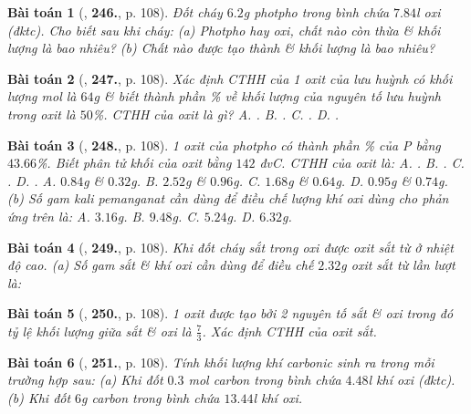 \documentclass{article}
\numberwithin{equation}{section}
\newtheorem{baitoan}{Bài toán}
\begin{document}
\begin{baitoan}[\cite{An_400_BT_Hoa_Hoc_8_2020}, \textbf{246.}, p. 108]
	Đốt cháy $6.2$\emph{g} photpho trong bình chứa $7.84$\emph{l} oxi (đktc). Cho biết sau khi cháy: (a) Photpho hay oxi, chất nào còn thừa \& khối lượng là bao nhiêu? (b) Chất nào được tạo thành \& khối lượng là bao nhiêu?
\end{baitoan}

\begin{baitoan}[\cite{An_400_BT_Hoa_Hoc_8_2020}, \textbf{247.}, p. 108]
	Xác định CTHH của 1 oxit của lưu huỳnh có khối lượng mol là $64$\emph{g} \& biết thành phần \% về khối lượng của nguyên tố lưu huỳnh trong oxit là $50$\%. CTHH của oxit là gì? {\sf A.} \emph{}. {\sf B.} \emph{}. {\sf C.} \emph{}. {\sf D.} \emph{}.
\end{baitoan}

\begin{baitoan}[\cite{An_400_BT_Hoa_Hoc_8_2020}, \textbf{248.}, p. 108]
	1 oxit của photpho có thành phần \% của \emph{P} bằng $43.66$\%. Biết phân tử khối của oxit bằng $142$ \emph{đvC}. CTHH của oxit là: {\sf A.} \emph{}. {\sf B.} \emph{}. {\sf C.} \emph{}. {\sf D.} \emph{}. {\sf A.} $0.84$\emph{g} \& $0.32$\emph{g}. {\sf B.} $2.52$\emph{g} \& $0.96$\emph{g}. {\sf C.} $1.68$\emph{g} \& $0.64$\emph{g}. {\sf D.} $0.95$\emph{g} \& $0.74$\emph{g}. (b) Số gam kali pemanganat \emph{} cần dùng để điều chế lượng khí oxi dùng cho phản ứng trên là: {\sf A.} $3.16$\emph{g}. {\sf B.} $9.48$\emph{g}. {\sf C.} $5.24$\emph{g}. {\sf D.} $6.32$\emph{g}.
\end{baitoan}

\begin{baitoan}[\cite{An_400_BT_Hoa_Hoc_8_2020}, \textbf{249.}, p. 108]
	Khi đốt cháy sắt trong oxi được oxit sắt từ \emph{} ở nhiệt độ cao. (a) Số gam sắt \& khí oxi cần dùng để điều chế $2.32$\emph{g} oxit sắt từ lần lượt là: 
\end{baitoan}

\begin{baitoan}[\cite{An_400_BT_Hoa_Hoc_8_2020}, \textbf{250.}, p. 108]
	1 oxit được tạo bởi 2 nguyên tố sắt \& oxi trong đó tỷ lệ khối lượng giữa sắt \& oxi là $\frac{7}{3}$. Xác định CTHH của oxit sắt.
\end{baitoan}

\begin{baitoan}[\cite{An_400_BT_Hoa_Hoc_8_2020}, \textbf{251.}, p. 108]
	Tính khối lượng khí carbonic sinh ra trong mỗi trường hợp sau: (a) Khi đốt $0.3$ \emph{mol} carbon trong bình chứa $4.48$\emph{l} khí oxi (đktc). (b) Khi đốt $6$\emph{g} carbon trong bình chứa $13.44$\emph{l} khí oxi.
\end{baitoan}
\end{document}
